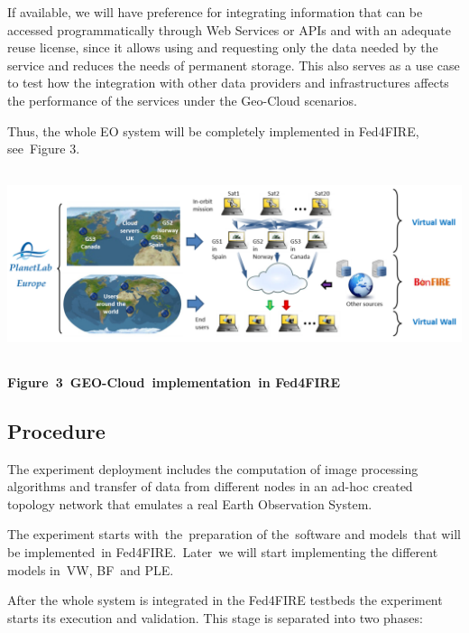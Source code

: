 \documentclass[a4paper]{article}
\begin{document}
\bigskip

If available, we will have preference for integrating information that
can be accessed programmatically through Web Services or APIs and with
an adequate reuse license, since it allows using and requesting only
the data needed by the service and reduces the needs of permanent
storage. This also serves as a use case to test how the integration
with other data providers and infrastructures affects the performance
of the services under the Geo-Cloud scenarios.\ 


\bigskip

Thus, the whole EO system will be completely implemented in Fed4FIRE,
see\ Figure 3.\ 

{\centering 
\includegraphics[width=6.18413in,height=2.15025in]{out-img7.png} \par}

{\centering\bfseries
\label{bkm:Ref361386330}Figure\ 3\ GEO-Cloud\ implementation\ in
Fed4FIRE
\par}


\bigskip

\subsection[Procedure]{Procedure}
\hypertarget{Toc378868689}{}
\bigskip

The experiment deployment includes the computation of image processing
algorithms and transfer of data from different nodes in an ad-hoc
created topology network that emulates a real Earth Observation System.


\bigskip

The experiment starts with\ the\ preparation of the\ software and
models\ that will be implemented\ in Fed4FIRE.\ Later\ we will start
implementing the different models in\ VW, BF\ and PLE.\ 


\bigskip

After the whole system is integrated in the Fed4FIRE testbeds the
experiment starts its execution and validation. This stage is separated
into two phases:\ 
\end{document}
